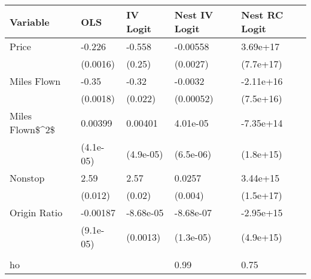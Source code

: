 
\begin{tabular}[t]{lllll}
\toprule
Variable & OLS & IV Logit & Nest IV Logit & Nest RC Logit\\
\midrule
Price & -0.226 & -0.558 & -0.00558 & 3.69e+17\\
 & (0.0016) & (0.25) & (0.0027) & (7.7e+17)\\
Miles Flown & -0.35 & -0.32 & -0.0032 & -2.11e+16\\
 & (0.0018) & (0.022) & (0.00052) & (7.5e+16)\\
Miles Flown\$\textasciicircum{}2\$ & 0.00399 & 0.00401 & 4.01e-05 & -7.35e+14\\
 & (4.1e-05) & (4.9e-05) & (6.5e-06) & (1.8e+15)\\
Nonstop & 2.59 & 2.57 & 0.0257 & 3.44e+15\\
 & (0.012) & (0.02) & (0.004) & (1.5e+17)\\
Origin Ratio & -0.00187 & -8.68e-05 & -8.68e-07 & -2.95e+15\\
 & (9.1e-05) & (0.0013) & (1.3e-05) & (4.9e+15)\\
\addlinespace[0.3em]
\multicolumn{5}{l}{\textbf{Goodness of Fit}}\\
\hspace{1em}ho &  &  & 0.99 & 0.75\\
\midrule
\bottomrule
\end{tabular}
